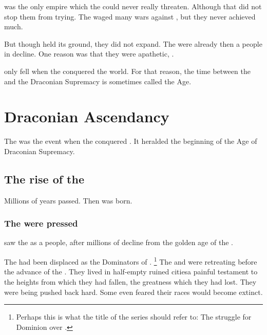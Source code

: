 \Saphyrae{} was the only \quiljaaran{} empire which the \aryothim{} could never really threaten. 
Although that did not stop them from trying. 
The \aryothim{} waged many wars against \Saphyrae, but they never achieved much. 

But though \Saphyrae{} held its ground, they did not expand. 
The \quiljaaran{} were already then a people in decline. 
One reason was that they were apathetic, . 

\Saphyrae{} only fell when the \dzraicchenosses{} conquered the world. 
For that reason, the time between the \firstbanewar{} and the Draconian Supremacy is sometimes called the \Saphyraean{} Age. 













\section{Draconian Ascendancy}
The  was the event when the \dzraicchenosses{} conquered \Miith. 
It heralded the beginning of the Age of Draconian Supremacy. 









\subsection{The rise of the \draecchonosh}
Millions of years passed. 
Then \Tiamat{} was born. 





\subsubsection{The \ophidians{} were pressed}
\Tiamat{} saw the \dragons{} as a  people, after millions of decline from the golden age of the . 

The \ophidians had been displaced as the Dominators of \Miith{}.%
\footnote{%
  Perhaps this is what the title of the series should refer to: 
  The struggle for Dominion over \Miith{}.%
} 
The \dragons{} and \quiljaaran were retreating before the advance of the \aryothim.
They lived in half-empty ruined cities\dash a painful testament to the heights from which they had fallen, the greatness which they had lost. 
They were being pushed back hard. 
Some even feared their races would become extinct. 

